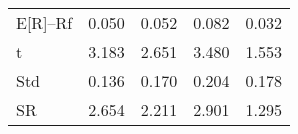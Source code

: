 \begin{tabular}{lrrrr}
\toprule
\midrule
E[R]--Rf & 0.050 & 0.052 & 0.082 & 0.032 \\
t & 3.183 & 2.651 & 3.480 & 1.553 \\
Std & 0.136 & 0.170 & 0.204 & 0.178 \\
SR & 2.654 & 2.211 & 2.901 & 1.295 \\
\bottomrule
\end{tabular}
